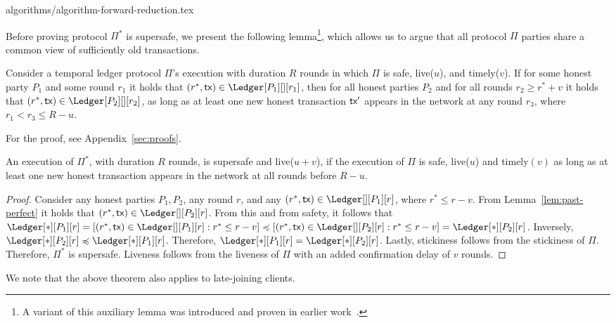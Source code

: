{algorithms/algorithm-forward-reduction.tex}

Before proving protocol $\Pi^*$ is supersafe, we present
the following lemma\footnote{
  A variant of this auxiliary lemma was introduced and proven in earlier work~\cite{rollerblade}.
}, which allows us to argue that all
protocol $\Pi$ parties share a common view of sufficiently old transactions.



\begin{lemma}\label{lem:past-perfect}
  Consider a temporal ledger protocol $\Pi$'s
  execution with duration $R$ rounds in which $\Pi$ is
  safe, live($u$), and timely($v$).
  If for some honest party $P_1$ and some round $r_1$ it holds that
  $(r^*, \tx) \in \Ledger[P_1][][r_1]$, then
  for all honest parties $P_2$ and for all rounds $r_2 \geq r^* + v$
  it holds that $(r^*, \tx) \in \Ledger[P_2][][r_2]$,
  as long as at least one new honest transaction $\textsf{tx}'$ appears in the
  network at any round $r_3$, where $r_1 < r_3 \leq R - u$.
\end{lemma}

For the proof, see Appendix~\ref{sec:proofs}.


\begin{theorem} \label{thm:timeliness-to-supersafety}
  An execution of $\Pi^*$, with duration $R$ rounds, is supersafe
  and live($u + v$), if the execution of
  $\Pi$ is safe, live($u$) and timely$(v)$
  as long as at least one new honest transaction appears in the
  network at all rounds before $R - u$.
\end{theorem}
\begin{proof}
  Consider any honest parties $P_1,P_2$, any round $r$, and any
  $(r^*, \tx) \in \Ledger[][P_1][r]$, where $r^* \leq r - v$.
  From Lemma~\ref{lem:past-perfect} it holds that
  $(r^*, \tx) \in \Ledger[][P_2][r]$.
  From this and from safety, it follows that
  $\Ledger[*][P_1][r] = [(r^*, \tx) \in \Ledger[][P_1][r]: r^* \leq r - v] \preccurlyeq
  [(r^*, \tx) \in \Ledger[][P_2][r]: r^* \leq r - v] = \Ledger[*][P_2][r]$.
  Inversely, $\Ledger[*][P_2][r] \preccurlyeq \Ledger[*][P_1][r]$.
  Therefore, $\Ledger[*][P_1][r] = \Ledger[*][P_2][r]$.
  Lastly, stickiness follows from the stickiness of $\Pi$.
  Therefore, $\Pi^*$ is supersafe.
  Liveness follows from the liveness of $\Pi$ with an added
  confirmation delay of $v$ rounds.
  \Qed
\end{proof}

We note that the above theorem also applies to late-joining clients.

